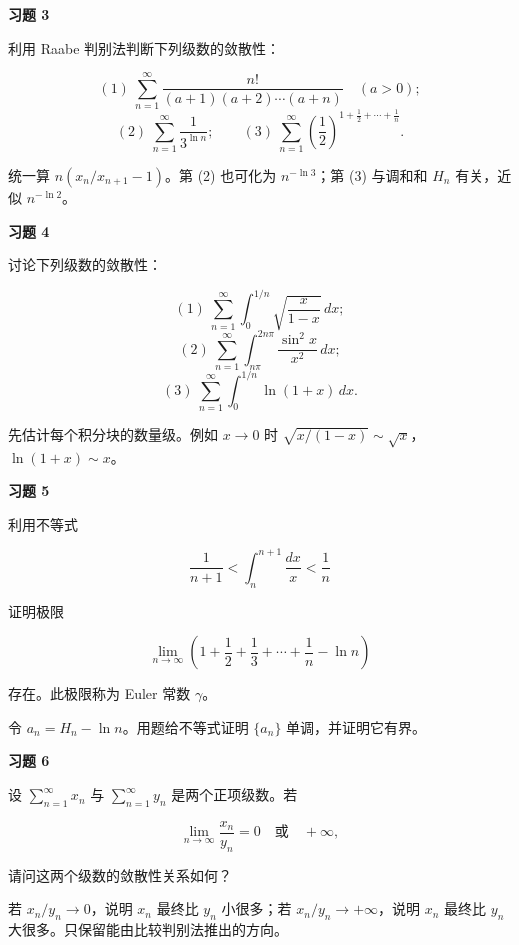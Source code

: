 \begin{exercisebox}
\textbf{习题 3 }

利用 Raabe 判别法判断下列级数的敛散性：

\[
      (1)\ \sum_{n=1}^{\infty}
      \frac{n!}{(a+1)(a+2)\cdots(a+n)}\quad(a>0);
      \]\[
      (2)\ \sum_{n=1}^{\infty}\frac1{3^{\ln n}};
      \qquad
      (3)\ \sum_{n=1}^{\infty}\left(\frac12\right)^{1+\frac12+\cdots+\frac1n}.
      \]

\begin{hintbox}
统一算 \(n(x_n/x_{n+1}-1)\)。第 (2) 也可化为 \(n^{-\ln3}\)；第 (3) 与调和和 \(H_n\) 有关，近似 \(n^{-\ln2}\)。
\end{hintbox}
\end{exercisebox}

\begin{exercisebox}
\textbf{习题 4 }

讨论下列级数的敛散性：

\[
      (1)\ \sum_{n=1}^{\infty}\int_0^{1/n}\sqrt{\frac{x}{1-x}}\,dx;
      \]\[
      (2)\ \sum_{n=1}^{\infty}\int_{n\pi}^{2n\pi}\frac{\sin^2 x}{x^2}\,dx;
      \]\[
      (3)\ \sum_{n=1}^{\infty}\int_0^{1/n}\ln(1+x)\,dx.
      \]

\begin{hintbox}
先估计每个积分块的数量级。例如 \(x\to0\) 时 \(\sqrt{x/(1-x)}\sim\sqrt x\)，\(\ln(1+x)\sim x\)。
\end{hintbox}
\end{exercisebox}

\begin{exercisebox}
\textbf{习题 5 }

利用不等式

\[
      \frac1{n+1}<\int_n^{n+1}\frac{dx}{x}<\frac1n
      \]

证明极限

\[
      \lim_{n\to\infty}\left(1+\frac12+\frac13+\cdots+\frac1n-\ln n\right)
      \]

存在。此极限称为 Euler 常数 \(\gamma\)。

\begin{hintbox}
令 \(a_n=H_n-\ln n\)。用题给不等式证明 \(\{a_n\}\) 单调，并证明它有界。
\end{hintbox}
\end{exercisebox}

\begin{exercisebox}
\textbf{习题 6 }

设 \(\sum_{n=1}^{\infty}x_n\) 与 \(\sum_{n=1}^{\infty}y_n\) 是两个正项级数。若

\[
      \lim_{n\to\infty}\frac{x_n}{y_n}=0
      \quad\text{或}\quad
      +\infty,
      \]

请问这两个级数的敛散性关系如何？

\begin{hintbox}
若 \(x_n/y_n\to0\)，说明 \(x_n\) 最终比 \(y_n\) 小很多；若 \(x_n/y_n\to+\infty\)，说明 \(x_n\) 最终比 \(y_n\) 大很多。只保留能由比较判别法推出的方向。
\end{hintbox}
\end{exercisebox}

